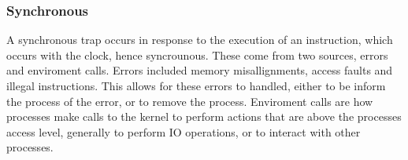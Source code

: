 \subsubsection{Synchronous}
A synchronous trap occurs in response to the execution of an instruction, which occurs with the clock, hence syncrounous. These come from two sources, errors and enviroment calls. Errors included memory misallignments, access faults and illegal instructions. This allows for these errors to handled, either to be inform the process of the error, or to remove the process. Enviroment calls are how processes make calls to the kernel to perform actions that are above the processes access level, generally to perform IO operations, or to interact with other processes.